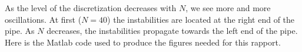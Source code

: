 \documentclass[11pt,a4paper]{report}
\begin{document}
\FloatBarrier

As the level of the discretization decreases with $N$, we see more and more oscillations. At first ($N=40$) the instabilities are located at the right end of the pipe. As $N$ decreases, the instabilities propagate towards the left end of the pipe.\\

Here is the Matlab code used to produce the figures needed for this rapport.


\end{document}
